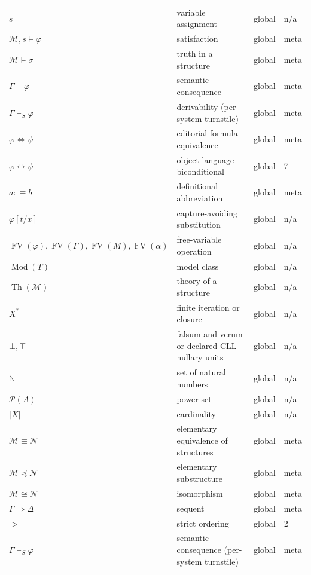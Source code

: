 \begin{longtable}{@{}p{}p{}p{}p{}@{}}
\(s\) & variable assignment & global & n/a \\
\(\mathcal M,\allowbreak s\models\varphi\) & satisfaction & global & meta \\
\(\mathcal M\models\sigma\) & truth in a structure & global & meta \\
\(\Gamma\models\varphi\) & semantic consequence & global & meta \\
\(\Gamma\vdash_{S}\varphi\) & derivability (per-system turnstile) & global & meta \\
\(\varphi\Leftrightarrow\psi\) & editorial formula equivalence & global & meta \\
\(\varphi\leftrightarrow\psi\) & object-language biconditional & global & 7 \\
\(a\mathrel{:\equiv}b\) & definitional abbreviation & global & meta \\
\(\varphi[t/x]\) & capture-avoiding substitution & global & n/a \\
\(\operatorname{FV}(\varphi),\allowbreak \operatorname{FV}(\Gamma),\allowbreak \operatorname{FV}(M),\allowbreak \operatorname{FV}(\alpha)\) & free-variable operation & global & n/a \\
\(\operatorname{Mod}(T)\) & model class & global & n/a \\
\(\operatorname{Th}(\mathcal M)\) & theory of a structure & global & n/a \\
\(X^*\) & finite iteration or closure & global & n/a \\
\(\bot,\allowbreak \top\) & falsum and verum or declared CLL nullary units & global & n/a \\
\(\mathbb N\) & set of natural numbers & global & n/a \\
\(\mathcal P(A)\) & power set & global & n/a \\
\(|X|\) & cardinality & global & n/a \\
\(\mathcal M\equiv\mathcal N\) & elementary equivalence of structures & global & meta \\
\(\mathcal M\preccurlyeq\mathcal N\) & elementary substructure & global & meta \\
\(\mathcal M\cong\mathcal N\) & isomorphism & global & meta \\
\(\Gamma\Rightarrow\Delta\) & sequent & global & meta \\
\(>\) & strict ordering & global & 2 \\
\(\Gamma\models_{S}\varphi\) & semantic consequence (per-system turnstile) & global & meta \\

\end{longtable}
